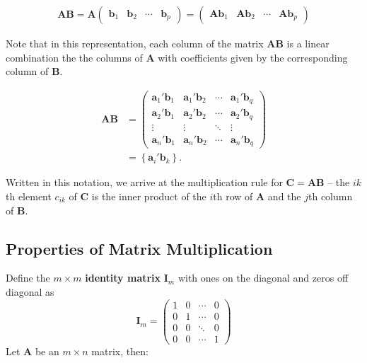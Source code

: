 \documentclass[
]{book}
\theoremstyle{definition}
\theoremstyle{definition}
\theoremstyle{definition}
\theoremstyle{definition}
\theoremstyle{remark}
\begin{document}
\[
\begin{aligned}
\mathbf{A} \mathbf{B}  = \mathbf{A} \begin{pmatrix} \mathbf{b}_1 & \mathbf{b}_2 & \cdots & \mathbf{b}_p
\end{pmatrix}  = \begin{pmatrix} \mathbf{A} \mathbf{b}_1 & \mathbf{A} \mathbf{b}_2 & \cdots & \mathbf{A} \mathbf{b}_p
\end{pmatrix} 
\end{aligned}
\]

Note that in this representation, each column of the matrix \(\mathbf{A}\mathbf{B}\) is a linear combination the the columns of \(\mathbf{A}\) with coefficients given by the corresponding column of \(\mathbf{B}\).

\[
\begin{aligned}
\mathbf{A} \mathbf{B} & = \begin{pmatrix} \mathbf{a}_1' \mathbf{b}_1 & \mathbf{a}_1' \mathbf{b}_2 & \cdots & \mathbf{a}_1' \mathbf{b}_q \\
\mathbf{a}_2' \mathbf{b}_1 & \mathbf{a}_2' \mathbf{b}_2 & \cdots & \mathbf{a}_2' \mathbf{b}_q \\
\vdots & \vdots & \ddots & \vdots \\
\mathbf{a}_n' \mathbf{b}_1 & \mathbf{a}_n' \mathbf{b}_2  & \cdots & \mathbf{a}_n' \mathbf{b}_q
\end{pmatrix} \\
& = \left\{ \mathbf{a}_i' \mathbf{b}_k  \right\}.
\end{aligned}
\]

Written in this notation, we arrive at the multiplication rule for \(\mathbf{C} = \mathbf{A} \mathbf{B}\) -- the \(ik\)th element \(c_{ik}\) of \(\mathbf{C}\) is the inner product of the \(i\)th row of \(\mathbf{A}\) and the \(j\)th column of \(\mathbf{B}\).

\hypertarget{properties-of-matrix-multiplication}{%
\subsection{Properties of Matrix Multiplication}\label{properties-of-matrix-multiplication}}

Define the \(m \times m\) \textbf{identity matrix} \(\mathbf{I}_m\) with ones on the diagonal and zeros off diagonal as
\[
\mathbf{I}_m = \begin{pmatrix} 1 & 0 & \cdots & 0 \\ 0 & 1 & \cdots & 0 \\ 0 & 0 & \ddots & 0 \\ 0 & 0 & \cdots & 1\end{pmatrix}
\]
Let \(\mathbf{A}\) be an \(m \times n\) matrix, then:
\end{document}
